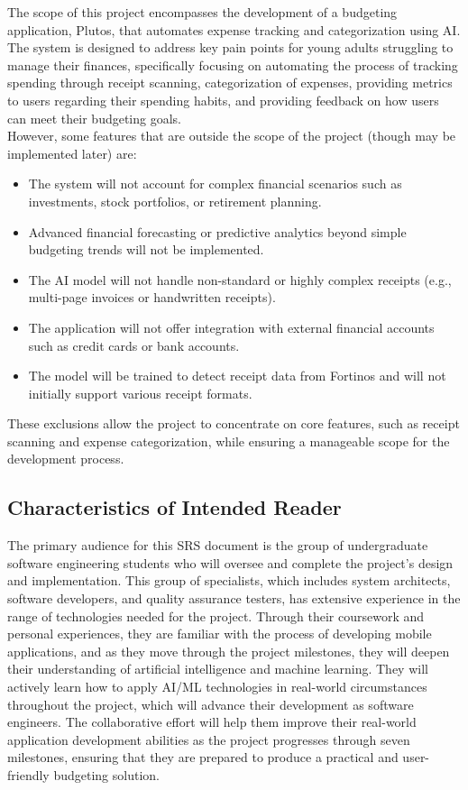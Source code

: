 \documentclass[12pt]{article}
\begin{document}
The scope of this project encompasses the development of a budgeting application, Plutos, that automates expense tracking 
and categorization using AI. The system is designed to address key pain points for young adults struggling to manage their 
finances, specifically focusing on automating the process of tracking spending through receipt scanning, categorization of 
expenses, providing metrics to users regarding their spending habits, and providing feedback on how users can meet their 
budgeting goals.\\

\noindent However, some features that are outside the scope of the project (though may be implemented later) are: 

\begin{itemize}
  \item The system will not account for complex financial scenarios such as investments, stock portfolios, or retirement planning.
  \item Advanced financial forecasting or predictive analytics beyond simple budgeting trends will not be implemented.
  \item The AI model will not handle non-standard or highly complex receipts (e.g., multi-page invoices or handwritten receipts).
  \item The application will not offer integration with external financial accounts such as credit cards or bank accounts.
  \item The model will be trained to detect receipt data from Fortinos and will not initially support various receipt formats.
\end{itemize}

\noindent These exclusions allow the project to concentrate on core features, such as receipt scanning and expense categorization, while ensuring a manageable scope for the development process.

\subsection{Characteristics of Intended Reader} \label{sec_IntendedReader}
The primary audience for this SRS document is the group of undergraduate software engineering students who will 
oversee and complete the project’s design and implementation. This group of specialists, which includes system architects, 
software developers, and quality assurance testers, has extensive experience in the range of technologies needed for 
the project. Through their coursework and personal experiences, they are familiar with the process of developing mobile 
applications, and as they move through the project milestones, they will deepen their understanding of artificial intelligence 
and machine learning. They will actively learn how to apply AI/ML technologies in real-world circumstances throughout 
the project, which will advance their development as software engineers. The collaborative effort will help them improve 
their real-world application development abilities as the project progresses through seven milestones, ensuring that they 
are prepared to produce a practical and user-friendly budgeting solution.
\end{document}
